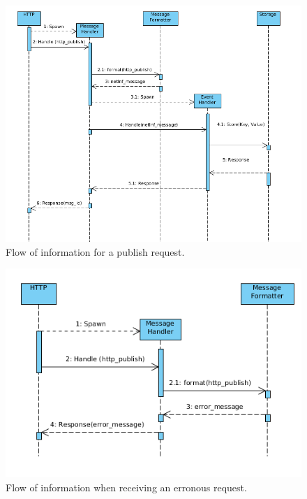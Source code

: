 \documentclass[11pt]{article}
\begin{document}
\begin{figure}[htb]
\centering
\includegraphics[width=1\textwidth]{seq_pub}
\caption{Flow of information for a publish request.}
\label{fig:sequence_pub}
\end{figure}

\begin{figure}[htb]
\centering
\includegraphics[width=1\textwidth]{seq_error}
\caption{Flow of information when receiving an erronous request.}
\label{fig:sequence_error}
\end{figure}
\end{document}
